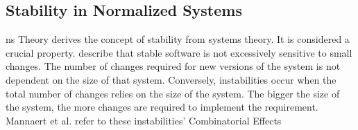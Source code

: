 \subsection{Stability in Normalized Systems} \label{subsec_on_stability}

\gls{ns} Theory derives the concept of stability from systems theory. It is considered a
crucial property. \textcite[270]{mannaert_normalized_2016}describe that stable software is
not excessively sensitive to small changes. The number of changes required for new
versions of the system is not dependent on the size of that system. Conversely,
instabilities occur when the total number of changes relies on the size of the system. The
bigger the size of the system, the more changes are required to implement the requirement.
Mannaert et al. \textcite[271]{mannaert_normalized_2016} refer to these instabilities'
\gls{Combinatorial Effects}